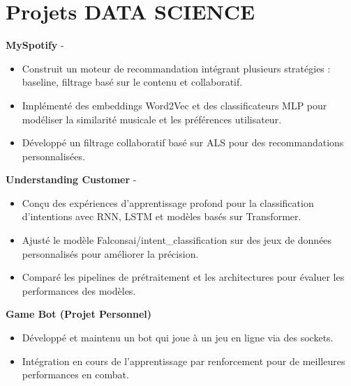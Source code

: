 \documentclass[a4paper,11pt]{article}%
\begin{document}
\section*{Projets DATA SCIENCE}%
%
\noindent \textbf{MySpotify} - \href{https://github.com/sboof911/MySpotify}{{}}%
\begin{itemize}[leftmargin=2em,label={},parsep=0pt,topsep=1em]%
\item Construit un moteur de recommandation int\'egrant plusieurs strat\'egies : baseline, filtrage bas\'e sur le contenu et collaboratif.%
\item Impl\'ement\'e des embeddings Word2Vec et des classificateurs MLP pour mod\'eliser la similarit\'e musicale et les pr\'ef\'erences utilisateur.%
\item D\'evelopp\'e un filtrage collaboratif bas\'e sur ALS pour des recommandations personnalis\'ees.%
\end{itemize}%
%
\noindent \textbf{Understanding Customer} - \href{https://github.com/sboof911/Understanding-customer}{{}}%
\begin{itemize}[leftmargin=2em,label={},parsep=0pt,topsep=1em]%
\item Con\c{c}u des exp\'eriences d'apprentissage profond pour la classification d'intentions avec RNN, LSTM et mod\`eles bas\'es sur Transformer.%
\item Ajust\'e le mod\`ele Falconsai/intent\_classification sur des jeux de donn\'ees personnalis\'es pour am\'eliorer la pr\'ecision.%
\item Compar\'e les pipelines de pr\'etraitement et les architectures pour \'evaluer les performances des mod\`eles.%
\end{itemize}%
%
\noindent \textbf{Game Bot (Projet Personnel)}%
\begin{itemize}[leftmargin=2em,label={},parsep=0pt,topsep=1em]%
\item D\'evelopp\'e et maintenu un bot qui joue \`a un jeu en ligne via des sockets.%
\item Int\'egration en cours de l'apprentissage par renforcement pour de meilleures performances en combat.%
\end{itemize}%
\end{document}
